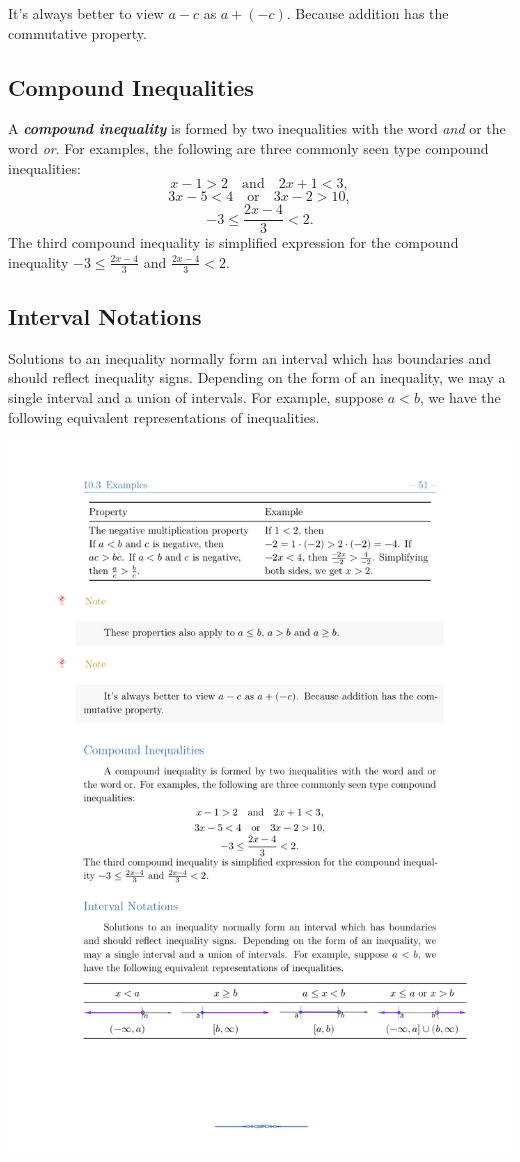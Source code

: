 \documentclass[en,12pt]{elegantbook}
\newenvironment{rmdnote}{
    \par\noindent
    \makebox[-\width][r]{
    \tiny\color{red!90}
    \textdbend
    \hspace*{2pt}
    }
    \makebox[\width][l]{
        \hspace*{3pt}
        \textbf{
            \color{second}
            Note 
        }
    }
    \begin{shaded}
    \itshape
}{
    \par
    \end{shaded}
}
\begin{document}
\begin{rmdnote}

It's always better to view \(a-c\) as \(a+(-c)\). Because addition has the commutative property.

\end{rmdnote}

\hypertarget{compound-inequalities}{%
\subsection*{Compound Inequalities}\label{compound-inequalities}}

A \textbf{\emph{compound inequality}} is formed by two inequalities with the word \emph{and} or the word \emph{or}. For examples, the following are three commonly seen type compound inequalities:
\[
x-1>2\quad \text{and} \quad 2x+1<3,
\]
\[
3x-5<4\quad \text{or} \quad 3x-2>10,
\]
\[
-3\leq \frac{2x-4}{3}<2.
\]
The third compound inequality is simplified expression for the compound inequality \(-3\leq \frac{2x-4}{3}\) and \(\frac{2x-4}{3}<2\).

\hypertarget{interval-notations}{%
\subsection*{Interval Notations}\label{interval-notations}}

Solutions to an inequality normally form an interval which has boundaries and should reflect inequality signs. Depending on the form of an inequality, we may a single interval and a union of intervals. For example, suppose \(a<b\), we have the following equivalent representations of inequalities.

\begin{center}\includegraphics[width=0.5\linewidth]{figs/linear-inequalities} \end{center}
\end{document}
